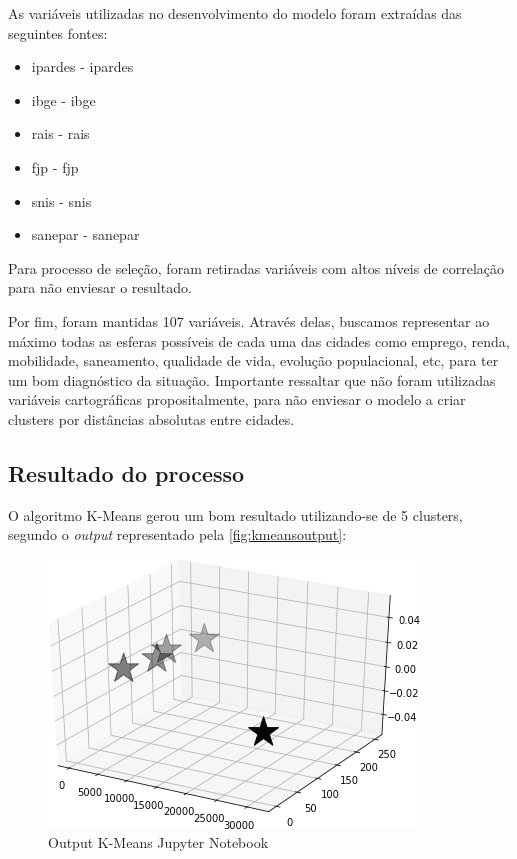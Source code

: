 	As variáveis utilizadas no desenvolvimento do modelo foram extraídas das seguintes fontes:
	
	\begin{itemize}
		\item \gls{ipardes} - \glsdesc{ipardes}
		\item \gls{ibge} - \glsdesc{ibge}
		\item \gls{rais} - \glsdesc{rais}
		\item \gls{fjp} - \glsdesc{fjp}
		\item \gls{snis} - \glsdesc{snis}
		\item \gls{sanepar} - \glsdesc{sanepar}
	\end{itemize}

	Para processo de seleção, foram retiradas variáveis com altos níveis de correlação para não enviesar o resultado. 
	
	Por fim, foram mantidas 107 variáveis. Através delas, buscamos representar ao máximo todas as esferas possíveis de cada uma das cidades como emprego, renda, mobilidade, saneamento, qualidade de vida, evolução populacional, etc, para ter um bom diagnóstico da situação. Importante ressaltar que não foram utilizadas variáveis cartográficas propositalmente, para não enviesar o modelo a criar clusters por distâncias absolutas entre cidades.
	
	\subsection{Resultado do processo}
	
	O algoritmo K-Means gerou um bom resultado utilizando-se de 5 clusters, segundo o \textit{output} representado pela \autoref{fig:kmeansoutput}:
	
	\begin{figure}
		\centering
		\caption{Output K-Means Jupyter Notebook}
		\label{fig:kmeansoutput}
		\includegraphics{img/machine_B}
	\end{figure}

